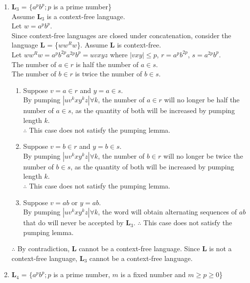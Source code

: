 \documentclass[10.5pt,letterpaper]{article}
\begin{document}
\begin{enumerate}[label=\textbf{Problem \arabic*.}]
\begin{enumerate}[label=\roman*)]
\begin{center}
			\end{center}
		\item \textbf{L$_3$} = $\{a^pb^p;p$ is a prime number\}\\
			Assume \textbf{L$_3$} is a context-free language.\\
			Let $w=a^pb^p$.\\
			Since context-free languages are closed under concatenation, consider the language \textbf{L} = \{$ww^Rw$\}. Assume \textbf{L} is context-free.\\
			Let $ww^Rw=a^pb^{2p}a^{2p}b^p=uvxyz$ where $|vxy|\leq p$, $r=a^pb^{2p}$, $s=a^{2p}b^p$.\\
			The number of $a \in r$ is half the number of $a \in s$.\\
			The number of $b \in r$ is twice the number of $b \in s$.
			\begin{enumerate}[label=\textbf{Case \arabic*:}]
				\item Suppose $v=a \in r$ and $y=a \in s$.\\
				By pumping $|uv^kxy^kz| \forall k$, the number of $a \in r$ will no longer be half the number of $a \in s$, as the quantity of both will be increased by pumping length $k$.\\
				$\therefore$ This case does not satisfy the pumping lemma.
				\item Suppose $v=b \in r$ and $y=b \in s$.\\
				By pumping $|uv^kxy^kz| \forall k$, the number of $b \in r$ will no longer be twice the number of $b \in s$, as the quantity of both will be increased by pumping length $k$.\\
				$\therefore$ This case does not satisfy the pumping lemma.
				\item Suppose $v=ab$ or $y=ab$.\\
				By pumping $|uv^kxy^kz| \forall k$, the word will obtain alternating sequences of $ab$ that do will never be accepted by \textbf{L$_3$}. 
				$\therefore$ This case does not satisfy the pumping lemma.
			\end{enumerate}
			$\therefore$ By contradiction, \textbf{L} cannot be a context-free language. Since \textbf{L} is not a context-free language, \textbf{L$_3$} cannot be a context-free language. 
		\item \textbf{L$_4$} = $\{a^pb^p;p$ is a prime number, $m$ is a fixed number and $m\geq p\geq 0$\}\\

\end{enumerate}
\end{enumerate}
\end{document}
